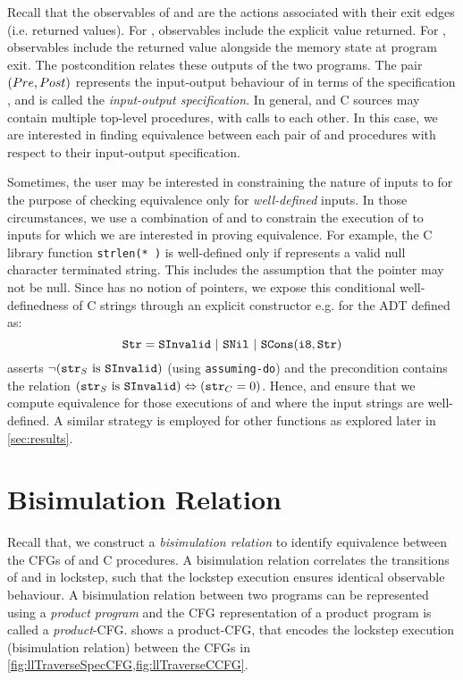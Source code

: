 Recall that the observables of \sprog{} and \cprog{} are the actions associated with their exit edges (i.e. returned values).
For \sprog{}, observables include the explicit value returned.
For \cprog{}, observables include the returned value alongside the memory state at program exit.
The postcondition \post{} relates these outputs of the two programs.
The pair $({Pre}{},{Post}{})$ represents the input-output behaviour of \cprog{} in terms of the specification \sprog{},
and is called the {\em input-output specification}.
In general, \SpecL{} and C sources may contain multiple top-level procedures, with calls to each other.
In this case, we are interested in finding equivalence between each pair
of \sprog{} and \cprog{} procedures with respect to their input-output specification.

Sometimes, the user may be interested in constraining the nature of inputs to \cprog{}
for the purpose of checking equivalence only for {\em well-defined} inputs.
In those circumstances, we use a combination of \pre{} and \sdef{} to constrain
the execution of \cprog{} to inputs for which we are interested in proving equivalence.
For example, the C library function {\tt strlen(* )} is well-defined only if 
represents a valid null character terminated string.
This includes the assumption that the pointer  may not be null.
Since \SpecL{} has no notion of pointers, we expose this conditional well-definedness of C strings
through an explicit constructor e.g.  for the  ADT defined as:
$$
\type{Str} = \cons{SInvalid}\ |\ \cons{SNil}\ |\ \cons{SCons}(\type{i8}, \type{Str})
$$
\sdef{} asserts $\neg({\tt str}_{S}\ \mathrm{is}\ {\tt SInvalid})$ (using {\tt assuming-do}) and
the precondition \pre{} contains the relation $({\tt str}_{S}\ \mathrm{is}\ {\tt SInvalid}) \Leftrightarrow ({\tt str}_{C}=0)$.
Hence, \sdef{} and \pre{} ensure that we compute equivalence for those
executions of \sprog{} and \cprog{} where the input strings are well-defined.
A similar strategy is employed for other functions as explored later in \cref{sec:results}.



\section{Bisimulation Relation}
\label{sec:bisim}
Recall that,
we construct a {\em bisimulation relation} to identify equivalence between the CFGs of \SpecL{} and C procedures.
A bisimulation relation correlates the transitions of \sprog{} and \cprog{} in lockstep, such that the
lockstep execution ensures identical observable behaviour.
A bisimulation relation between two programs can be represented using a {\em product program}
\cite{covac} and the CFG representation of a product program is called a {\em product}-CFG.
 shows a product-CFG, that encodes the lockstep execution
(bisimulation relation) between the CFGs in \cref{fig:llTraverseSpecCFG,fig:llTraverseCCFG}.

